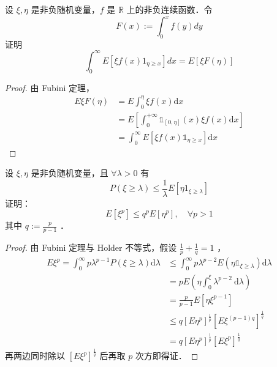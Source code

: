 \begin{exercise}
    设 $\xi, \eta$ 是非负随机变量，$f$ 是 $\mathbb{R}$ 上的非负连续函数．令
    $$
        F(x):=\int_0^x f(y) d y
    $$
    证明
    $$
        \int_0^{\infty} E\left[\xi f(x) 1_{\eta \geqslant x}\right] d x=E[\xi F(\eta)]
    $$
\end{exercise}
\begin{proof}
    由 Fubini 定理，
    $$
        \begin{aligned}
            E \xi F(\eta) & =E \int_0^\eta \xi f(x) \mathrm{d} x                                               \\
                          & =E\left[\int_0^{+\infty} \mathbb{1}_{[0,\eta]}(x) \xi f(x) \mathrm{d} x\right] \\
                          & =\int_0^{\infty} E\left[\xi f(x) \mathbb{1}_{\eta \geq x}\right] \mathrm{d} x
        \end{aligned}
    $$
\end{proof}
\begin{exercise}
    设 $\xi, \eta$ 是非负随机变量，且 $\forall \lambda>0$ 有
    $$
        P(\xi \geqslant \lambda) \leqslant \frac{1}{\lambda} E\left[\eta 1_{\xi \geqslant \lambda}\right]
    $$
    证明：              
    $$
        E\left[\xi^p\right] \leqslant q^p E\left[\eta^p\right], \quad \forall p>1
    $$
    其中 $q:=\frac{p}{p-1}$ ．
\end{exercise}
\begin{proof}
    由 Fubini 定理与 Holder 不等式，假设 $\frac{1}{p}+\frac{1}{q}=1$ ，
    $$
        \begin{aligned}
            E \xi^p=\int_0^{\infty} p \lambda^{p-1} P(\xi \geq \lambda) \mathrm{d} \lambda & \leq \int_0^{\infty} p \lambda^{p-2} E\left(\eta \mathbb{1}_{\xi \geq \lambda}\right) \mathrm{d} \lambda \\
                                                                                           & =p E\left(\eta \int_0^{\xi} \lambda^{p-2} \mathrm{~d} \lambda\right)                                     \\
                                                                                           & =\frac{p}{p-1} E\left[\eta \xi^{p-1}\right]                                                              \\
                                                                                           & \leq q\left[E \eta^p\right]^{\frac{1}{p}}\left[E \xi^{(p-1) q}\right]^{\frac{1}{q}}                      \\
                                                                                           & =q\left[E \eta^p\right]^{\frac{1}{p}}\left[E \xi^p\right]^{\frac{1}{q}}
        \end{aligned}
    $$
    再两边同时除以 $\left[E \xi^p\right]^{\frac{1}{q}}$ 后再取 $p$ 次方即得证．
\end{proof}
